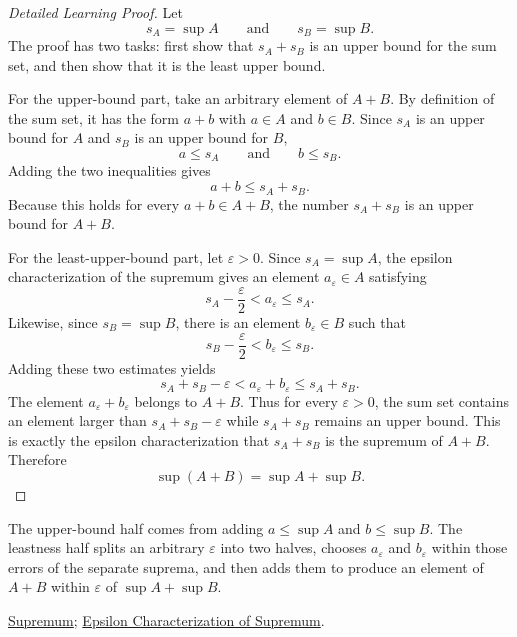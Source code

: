 \begin{proof}[Detailed Learning Proof]
\LRAProofBodyStart
Let
\[
s_A=\sup A
\qquad\text{and}\qquad
s_B=\sup B.
\]
The proof has two tasks: first show that $s_A+s_B$ is an upper bound for the
sum set, and then show that it is the least upper bound.

For the upper-bound part, take an arbitrary element of $A+B$. By definition of
the sum set, it has the form $a+b$ with $a\in A$ and $b\in B$. Since $s_A$ is
an upper bound for $A$ and $s_B$ is an upper bound for $B$,
\[
a\le s_A
\qquad\text{and}\qquad
b\le s_B.
\]
Adding the two inequalities gives
\[
a+b\le s_A+s_B.
\]
Because this holds for every $a+b\in A+B$, the number $s_A+s_B$ is an upper
bound for $A+B$.

For the least-upper-bound part, let $\varepsilon>0$. Since $s_A=\sup A$, the
epsilon characterization of the supremum gives an element
$a_\varepsilon\in A$ satisfying
\[
s_A-\frac{\varepsilon}{2}<a_\varepsilon\le s_A.
\]
Likewise, since $s_B=\sup B$, there is an element $b_\varepsilon\in B$ such
that
\[
s_B-\frac{\varepsilon}{2}<b_\varepsilon\le s_B.
\]
Adding these two estimates yields
\[
s_A+s_B-\varepsilon
<
a_\varepsilon+b_\varepsilon
\le
s_A+s_B.
\]
The element $a_\varepsilon+b_\varepsilon$ belongs to $A+B$. Thus for every
$\varepsilon>0$, the sum set contains an element larger than
$s_A+s_B-\varepsilon$ while $s_A+s_B$ remains an upper bound. This is exactly
the epsilon characterization that $s_A+s_B$ is the supremum of $A+B$.
Therefore
\[
\sup(A+B)=\sup A+\sup B.
\]
\end{proof}

\begin{remark*}
The upper-bound half comes from adding $a\le\sup A$ and $b\le\sup B$. The
leastness half splits an arbitrary $\varepsilon$ into two halves, chooses
$a_\varepsilon$ and $b_\varepsilon$ within those errors of the separate
suprema, and then adds them to produce an element of $A+B$ within
$\varepsilon$ of $\sup A+\sup B$.
\end{remark*}

\begin{dependencies}
\hyperref[def:supremum]{Supremum};
\hyperref[def:epsilon-characterization-of-supremum]{Epsilon Characterization of Supremum}.
\end{dependencies}

\clearpage
